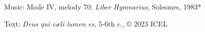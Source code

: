 



\begin{hymnsource}
Music: Mode IV, melody 70; \emph{Liber Hymnarius}, Solesmes, 1983*

Text: \emph{Deus qui cæli lumen es}, 5-6th c., © 2023 ICEL
\end{hymnsource}
